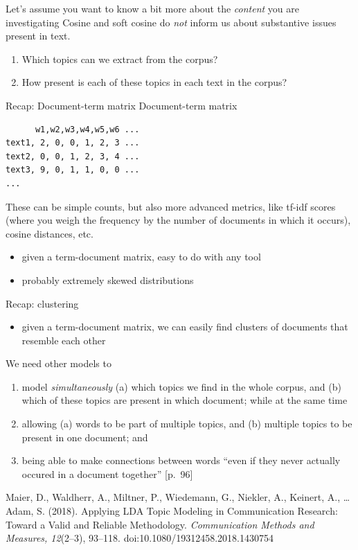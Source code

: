 \documentclass[handout]{beamer}
\begin{document}
\begin{frame}{Let's assume you want to know a bit more about the \emph{content} you are investigating}
Cosine and soft cosine do \emph{not} inform us about substantive issues present in text. 
	\begin{enumerate}
		\item Which topics can we extract from the corpus?
		\item How present is each of these topics in each text in the corpus?
	\end{enumerate}
\end{frame}

\begin{frame}[fragile]{Recap: Document-term matrix}
	Document-term matrix
	\begin{lstlisting}
      w1,w2,w3,w4,w5,w6 ...
text1, 2, 0, 0, 1, 2, 3 ...
text2, 0, 0, 1, 2, 3, 4 ...
text3, 9, 0, 1, 1, 0, 0 ...
...
	\end{lstlisting}
	{\small{These can be simple counts, but also more advanced metrics, like tf-idf scores (where you weigh the frequency by the number of documents in which it occurs), cosine distances, etc.}}
	\pause
	\begin{itemize}
		\item given a term-document matrix, easy to do with any tool
		\item probably extremely skewed distributions
	\end{itemize}
	
\end{frame}


\begin{frame}{Recap: clustering}
	\begin{itemize}
		\item given a term-document matrix, we can easily find clusters of documents that resemble each other
	\end{itemize}
\end{frame}


\begin{frame}{We need other models to}
	\begin{enumerate}[<+->]
		\item model \emph{simultaneously} (a) which topics we find in the whole corpus, and (b) which of these topics are present in which document; while at the same time
		\item allowing (a) words to be part of multiple topics, and (b) multiple topics to be present in one document; and
		\item being able to make connections between words ``even if they never actually occured in a document together'' \parencite{Maier2018}[p.~96]
	\end{enumerate}
	
	\tiny{Maier, D., Waldherr, A., Miltner, P., Wiedemann, G., Niekler, A., Keinert, A., \ldots Adam, S. (2018). Applying LDA Topic Modeling in Communication Research: Toward a Valid and Reliable Methodology. \textit{Communication Methods and Measures, 12}(2--3), 93--118. doi:10.1080/19312458.2018.1430754}
\end{frame}
\end{document}
